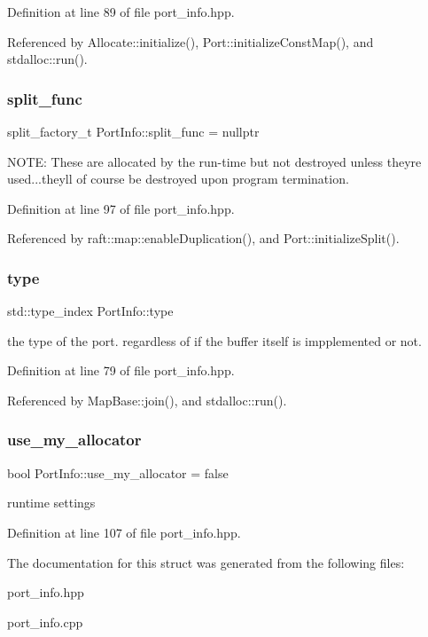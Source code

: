 Definition at line 89 of file port\+\_\+info.\+hpp.



Referenced by Allocate\+::initialize(), Port\+::initialize\+Const\+Map(), and stdalloc\+::run().

\hypertarget{struct_port_info_a6b7e8758b84288a4378233251252be77}{}\label{struct_port_info_a6b7e8758b84288a4378233251252be77} 
\subsubsection{\texorpdfstring{split\+\_\+func}{split\_func}}
{\footnotesize\ttfamily split\+\_\+factory\+\_\+t Port\+Info\+::split\+\_\+func = nullptr}

N\+O\+TE\+: These are allocated by the run-\/time but not destroyed unless they\textquotesingle{}re used...they\textquotesingle{}ll of course be destroyed upon program termination. 

Definition at line 97 of file port\+\_\+info.\+hpp.



Referenced by raft\+::map\+::enable\+Duplication(), and Port\+::initialize\+Split().

\hypertarget{struct_port_info_a669818f0fde1da7b4a294c46e08d5980}{}\label{struct_port_info_a669818f0fde1da7b4a294c46e08d5980} 
\subsubsection{\texorpdfstring{type}{type}}
{\footnotesize\ttfamily std\+::type\+\_\+index Port\+Info\+::type}

the type of the port. regardless of if the buffer itself is impplemented or not. 

Definition at line 79 of file port\+\_\+info.\+hpp.



Referenced by Map\+Base\+::join(), and stdalloc\+::run().

\hypertarget{struct_port_info_a5da81ef07f28858445aa768700948cf2}{}\label{struct_port_info_a5da81ef07f28858445aa768700948cf2} 
\subsubsection{\texorpdfstring{use\+\_\+my\+\_\+allocator}{use\_my\_allocator}}
{\footnotesize\ttfamily bool Port\+Info\+::use\+\_\+my\+\_\+allocator = false}

runtime settings 

Definition at line 107 of file port\+\_\+info.\+hpp.



The documentation for this struct was generated from the following files\+:\begin{DoxyCompactItemize}
\item 
port\+\_\+info.\+hpp\item 
port\+\_\+info.\+cpp\end{DoxyCompactItemize}
